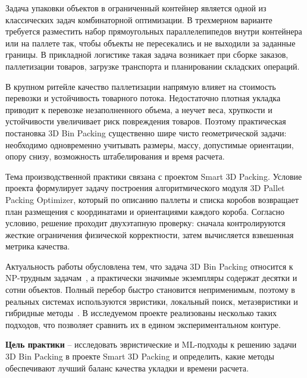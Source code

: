 
Задача упаковки объектов в ограниченный контейнер является одной из классических задач комбинаторной оптимизации. В трехмерном варианте требуется разместить набор прямоугольных параллелепипедов внутри контейнера или на паллете так, чтобы объекты не пересекались и не выходили за заданные границы. В прикладной логистике такая задача возникает при сборке заказов, паллетизации товаров, загрузке транспорта и планировании складских операций.

В крупном ритейле качество паллетизации напрямую влияет на стоимость перевозки и устойчивость товарного потока. Недостаточно плотная укладка приводит к перевозке незаполненного объема, а неучет веса, хрупкости и устойчивости увеличивает риск повреждения товаров. Поэтому практическая постановка 3D Bin Packing существенно шире чисто геометрической задачи: необходимо одновременно учитывать размеры, массу, допустимые ориентации, опору снизу, возможность штабелирования и время расчета.

Тема производственной практики связана с проектом Smart 3D Packing. Условие проекта формулирует задачу построения алгоритмического модуля 3D Pallet Packing Optimizer, который по описанию паллеты и списка коробов возвращает план размещения с координатами и ориентациями каждого короба. Согласно условию, решение проходит двухэтапную проверку: сначала контролируются жесткие ограничения физической корректности, затем вычисляется взвешенная метрика качества.

Актуальность работы обусловлена тем, что задача 3D Bin Packing относится к NP-трудным задачам~\cite{martello2000}, а практически значимые экземпляры содержат десятки и сотни объектов. Полный перебор быстро становится неприменимым, поэтому в реальных системах используются эвристики, локальный поиск, метаэвристики и гибридные методы~\cite{pisinger2010}. В исследуемом проекте реализованы несколько таких подходов, что позволяет сравнить их в едином экспериментальном контуре.

\textbf{Цель практики} -- исследовать эвристические и ML-подходы к решению задачи 3D Bin Packing в проекте Smart 3D Packing и определить, какие методы обеспечивают лучший баланс качества укладки и времени расчета.

